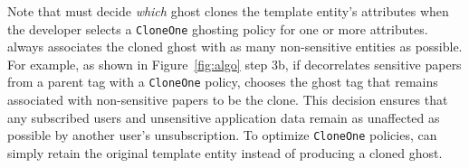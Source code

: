 Note that \proto must decide \emph{which} ghost clones the template entity's attributes when the
developer selects a \texttt{CloneOne} ghosting policy for one or more attributes. \proto always
associates the cloned ghost with as many non-sensitive entities as possible. For example, as shown
in Figure~\ref{fig:algo} step 3b, if \proto decorrelates sensitive papers from a parent tag with a
\texttt{CloneOne} policy, \proto chooses the ghost tag that remains associated with non-sensitive
papers to be the clone. This decision ensures that any subscribed users and unsensitive application
data remain as unaffected as possible by another user's unsubscription. To optimize
\texttt{CloneOne} policies, \proto can simply retain the original template entity instead of producing
a cloned ghost.
\fi

